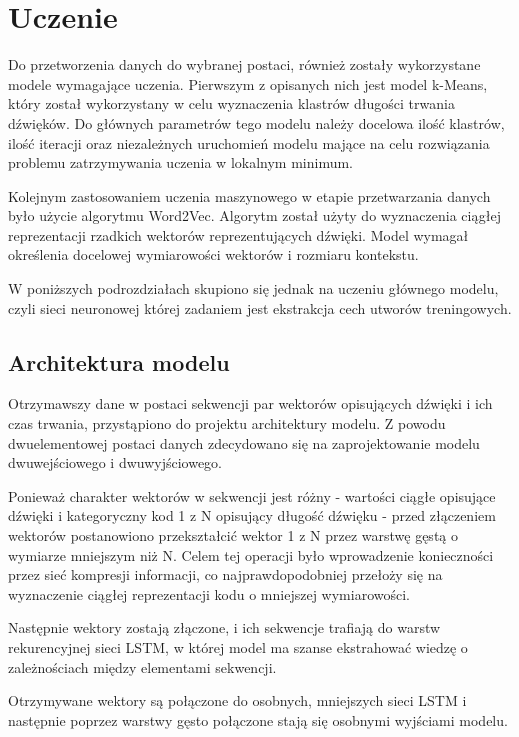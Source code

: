 \chapter{Uczenie} 
{
    Do przetworzenia danych do wybranej postaci, również zostały wykorzystane modele wymagające uczenia.
    Pierwszym z opisanych nich jest model k-Means, który został wykorzystany w celu wyznaczenia klastrów
    długości trwania dźwięków. Do głównych parametrów tego modelu należy docelowa ilość klastrów, ilość iteracji
    oraz niezależnych uruchomień modelu mające na celu rozwiązania problemu zatrzymywania uczenia w lokalnym minimum.
    
    Kolejnym zastosowaniem uczenia maszynowego w etapie przetwarzania danych było użycie algorytmu Word2Vec. Algorytm 
    został użyty do wyznaczenia ciągłej reprezentacji rzadkich wektorów reprezentujących dźwięki. Model wymagał 
    określenia docelowej wymiarowości wektorów i rozmiaru kontekstu. 

    W poniższych podrozdziałach skupiono się jednak na uczeniu głównego modelu, czyli sieci neuronowej której
    zadaniem jest ekstrakcja cech utworów treningowych.

    \section{Architektura modelu}
    {
        Otrzymawszy dane w postaci sekwencji par wektorów opisujących dźwięki i ich czas trwania,
        przystąpiono do projektu architektury modelu. Z powodu dwuelementowej postaci danych
        zdecydowano się na zaprojektowanie modelu dwuwejściowego i dwuwyjściowego.

        Ponieważ charakter wektorów w sekwencji jest różny - wartości ciągłe opisujące dźwięki i 
        kategoryczny kod 1 z N opisujący długość dźwięku - przed złączeniem wektorów postanowiono 
        przekształcić wektor 1 z N przez warstwę gęstą o wymiarze mniejszym niż N. Celem tej operacji
        było wprowadzenie konieczności przez sieć kompresji informacji, co najprawdopodobniej przełoży się 
        na wyznaczenie ciągłej reprezentacji kodu o mniejszej wymiarowości. 

        Następnie wektory zostają złączone, i ich sekwencje trafiają do warstw rekurencyjnej sieci LSTM,
        w której model ma szanse ekstrahować wiedzę o zależnościach między elementami sekwencji.

        Otrzymywane wektory są połączone do osobnych, mniejszych sieci LSTM i następnie poprzez warstwy 
        gęsto połączone stają się osobnymi wyjściami modelu.
        
}}
